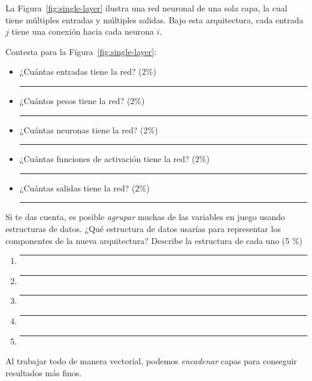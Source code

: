 \documentclass{article}
\newcommand{\responserule}{{\large\rule{14 cm}{0.3mm}}}
\newcommand{\veryshortresponserule}{{\large\rule{3 cm}{0.3mm}}}
\begin{document}
La Figura~\ref{fig:single-layer} ilustra una red neuronal de una sola capa, la cual tiene múltiples entradas y múltiples salidas.
Bajo esta arquitectura, cada entrada $j$ tiene una conexión hacia cada neurona $i$.

\vspace{2.5ex}

Contesta para la Figura~\ref{fig:single-layer}:

\begin{itemize}
    \item ¿Cuántas entradas tiene la red? (2\%) \hfill \veryshortresponserule
    \item ¿Cuántos pesos tiene la red? (2\%) \hfill \veryshortresponserule
    \item ¿Cuántas neuronas tiene la red? (2\%) \hfill \veryshortresponserule
    \item ¿Cuántas funciones de activación tiene la red? (2\%) \hfill \veryshortresponserule
    \item ¿Cuántas salidas tiene la red? (2\%) \hfill \veryshortresponserule
\end{itemize}

Si te das cuenta, es posible \textit{agrupar} muchas de las variables en juego usando estructuras de datos.
¿Qué estructura de datos usarías para representar los componentes de la nueva arquitectura?
Describe la estructura de cada uno (5 \%)

\begin{enumerate}
    \itemsep2.5ex
    \item \responserule
    \item \responserule
    \item \responserule
    \item \responserule
    \item \responserule
\end{enumerate}

Al trabajar todo de manera vectorial, podemos \textit{encadenar} capas para conseguir resultados más finos.
\end{document}
